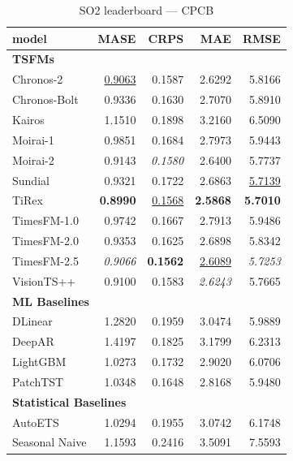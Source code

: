 \begin{table}[H]
\caption{SO2 leaderboard --- CPCB}
\centering
\begin{small}
\begin{tabular}{lrrrr}
\toprule
model & MASE & CRPS & MAE & RMSE \\
\midrule
\multicolumn{5}{l}{\textbf{TSFMs}} \\
Chronos-2 & \underline{0.9063} & 0.1587 & 2.6292 & 5.8166 \\
Chronos-Bolt & 0.9336 & 0.1630 & 2.7070 & 5.8910 \\
Kairos & 1.1510 & 0.1898 & 3.2160 & 6.5090 \\
Moirai-1 & 0.9851 & 0.1684 & 2.7973 & 5.9443 \\
Moirai-2 & 0.9143 & \textit{0.1580} & 2.6400 & 5.7737 \\
Sundial & 0.9321 & 0.1722 & 2.6863 & \underline{5.7139} \\
TiRex & \textbf{0.8990} & \underline{0.1568} & \textbf{2.5868} & \textbf{5.7010} \\
TimesFM-1.0 & 0.9742 & 0.1667 & 2.7913 & 5.9486 \\
TimesFM-2.0 & 0.9353 & 0.1625 & 2.6898 & 5.8342 \\
TimesFM-2.5 & \textit{0.9066} & \textbf{0.1562} & \underline{2.6089} & \textit{5.7253} \\
VisionTS++ & 0.9100 & 0.1583 & \textit{2.6243} & 5.7665 \\
\midrule
\multicolumn{5}{l}{\textbf{ML Baselines}} \\
DLinear & 1.2820 & 0.1959 & 3.0474 & 5.9889 \\
DeepAR & 1.4197 & 0.1825 & 3.1799 & 6.2313 \\
LightGBM & 1.0273 & 0.1732 & 2.9020 & 6.0706 \\
PatchTST & 1.0348 & 0.1648 & 2.8168 & 5.9480 \\
\midrule
\multicolumn{5}{l}{\textbf{Statistical Baselines}} \\
AutoETS & 1.0294 & 0.1955 & 3.0742 & 6.1748 \\
Seasonal Naive & 1.1593 & 0.2416 & 3.5091 & 7.5593 \\
\bottomrule
\end{tabular}
\end{small}
\end{table}